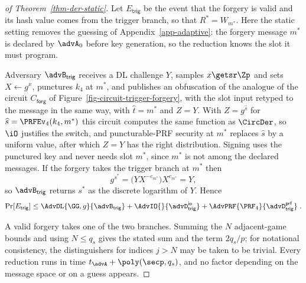 \begin{proof}[of Theorem~\ref{thm-der-static}]
 Let $E_{\mathsf{trig}}$ be the event that the forgery is valid and its hash value comes from the trigger branch, so that $R^*=W_{m^*}$. Here the static setting removes the guessing of Appendix~\ref{app-adaptive}: the forgery message $m^*$ is declared by $\advA_0$ before key generation, so the reduction knows the slot it must program.

Adversary $\advB_{\mathsf{trig}}$ receives a DL challenge $Y$, samples $x\getsr\Zp$ and sets $X\gets g^x$, punctures $k_4$ at $m^*$, and publishes an obfuscation of the analogue of the circuit $C_{\mathsf{forg}}$ of Figure~\ref{fig-circuit-trigger-forgery}, with the slot input retyped to the message in the same way, with $\widehat t=m^*$ and $Z=Y$. With $Z=g^{\widehat s}$ for $\widehat s=\PRFEv_4(k_4,m^*)$ this circuit computes the same function as $\CircDer$, so $\iO$ justifies the switch, and puncturable-PRF security at $m^*$ replaces $\widehat s$ by a uniform value, after which $Z=Y$ has the right distribution. Signing uses the punctured key and never needs slot $m^*$, since $m^*$ is not among the declared messages. If the forgery takes the trigger branch at $m^*$ then
$$
g^{s^*}=\big(YX^{-c_{m^*}}\big)X^{c_{m^*}}=Y,
$$
so $\advB_{\mathsf{trig}}$ returns $s^*$ as the discrete logarithm of $Y$. Hence
$$
\Pr[E_{\mathsf{trig}}]\le
\AdvDL{\GG,g}{\advB_{\mathsf{trig}}}
+\AdvIO{}{\advD^{\mathsf{io}}_{\mathsf{trig}}}
+\AdvPRF{\PRF_4}{\advD^{\mathsf{prf}}_{\mathsf{trig}}} \;.
$$

 A valid forgery takes one of the two branches. Summing the $N$ adjacent-game bounds and using $N\le q_s$ gives the stated sum and the term $2q_s/p$; for notational consistency, the distinguishers for indices $j>N$ may be taken to be trivial. Every reduction runs in time $t_{\advA}+\poly(\secp,q_s)$, and no factor depending on the message space or on a guess appears.
\end{proof}
